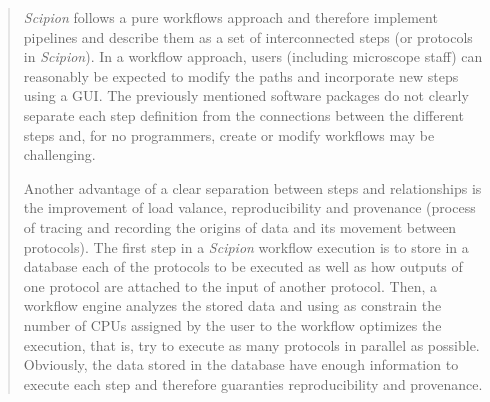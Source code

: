 \documentclass[a4paper,12pt]{article}
\def\scipion{\textit{Scipion}\xspace}
\begin{document}
\begin{reviewer}
\begin{quote}
\scipion follows a pure workflows approach and therefore implement pipelines and describe them as a set of interconnected steps (or protocols in \scipion). In a workflow approach, users (including microscope staff) can reasonably be expected to modify the paths and incorporate new steps using a GUI. The previously mentioned software packages do not clearly separate each step definition from the connections between the different steps and, for no programmers, create or modify workflows may be challenging. 

Another advantage of a clear separation between steps and relationships 
is the improvement of load valance, reproducibility and  provenance (process of tracing and recording the origins of data and its movement between protocols). The first step in a \scipion workflow execution
is to store in a database each of the protocols to be executed as well as how 
outputs of one protocol are attached to the input of another protocol. Then, a workflow engine analyzes the stored data and using as constrain the number of CPUs assigned by the user to the workflow optimizes the execution, that is, try to execute as many protocols in parallel as possible. Obviously, the data stored in the database  have enough information to execute each step and therefore guaranties reproducibility and provenance.
\end{quote}






\end{reviewer}
\end{document}
